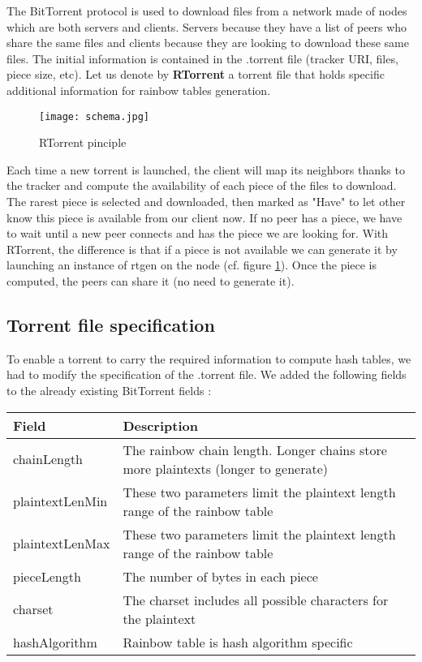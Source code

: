 \documentclass[a4paper]{article}
\begin{document}
{The BitTorrent protocol is used to download files from a network made of nodes which are both servers and clients. Servers because they have a list of peers who share the same files and clients because they are looking to download these same files. The initial information is contained in the .torrent file (tracker URI, files, piece size, etc). Let us denote by \textbf{RTorrent} a torrent file that holds specific additional information for rainbow tables generation.
\vspace{2mm}

\begin{figure}[H]
  \centering
    \texttt{[image: schema.jpg]}
    \caption{RTorrent pinciple}
    \label{principle}
\end{figure}
\vspace{2mm}

Each time a new torrent is launched, the client will map its neighbors thanks to the tracker and compute the availability of each piece of the files to download. The rarest piece is selected and downloaded, then marked as "Have" to let other know this piece is available from our client now. If no peer has a piece, we have to wait until a new peer connects and has the piece we are looking for. With RTorrent, the difference is that if a piece is not available we can generate it by launching an instance of rtgen on the node (cf. figure \ref{principle}). Once the piece is computed, the peers can share it (no need to generate it).

\subsection{Torrent file specification}

To enable a torrent to carry the required information to compute hash tables, we had to modify the specification 
of the .torrent file. We added the following fields to the already existing BitTorrent fields :

\begin{center}
\begin{tabular}{|l|l|}
\hline 
\textbf{Field} & \textbf{Description} \\ 
\hline 
chainLength & The rainbow chain length. Longer chains store more plaintexts (longer to generate)\\ 
\hline 
plaintextLenMin & These two parameters limit the plaintext length range of the rainbow table\\ 
\hline 
plaintextLenMax & These two parameters limit the plaintext length range of the rainbow table\\ 
\hline 
pieceLength & The number of bytes in each piece\\ 
\hline 
charset & The charset includes all possible characters for the plaintext\\ 
\hline 
hashAlgorithm & Rainbow table is hash algorithm specific\\
\hline 
\end{tabular} 
\end{center}
\vspace{3mm}

}
\end{document}
